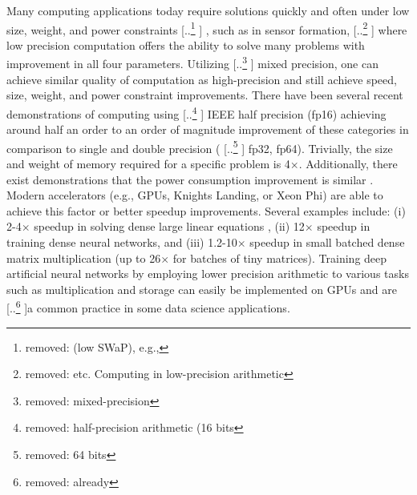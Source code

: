 \documentclass[review,onefignum,onetabnum]{siamart190516}
\providecommand{\DIFadd}[1]{{\protect\color{blue} \sf #1}} %
\providecommand{\DIFdel}[1]{{\protect\color{red} [..\footnote{removed: #1} ]}} %
\providecommand{\DIFaddbegin}{} %
\providecommand{\DIFaddend}{} %
\providecommand{\DIFdelbegin}{} %
\providecommand{\DIFdelend}{} %
\begin{document}
Many computing applications today require solutions quickly and often under low size, weight, and power constraints\DIFdelbegin \DIFdel{(low SWaP), e.g., }\DIFdelend \DIFaddbegin \DIFadd{, such as in }\DIFaddend sensor formation, \DIFdelbegin \DIFdel{etc. 
Computing in low-precision arithmetic }\DIFdelend \DIFaddbegin \DIFadd{where
low precision computation }\DIFaddend offers the ability to solve many problems with improvement in all four parameters.
Utilizing \DIFdelbegin \DIFdel{mixed-precision}\DIFdelend \DIFaddbegin \DIFadd{mixed precision}\DIFaddend , one can achieve similar quality of computation as high-precision and still achieve 
speed, size, weight, and power constraint improvements. 
There have been several recent demonstrations of computing using \DIFdelbegin \DIFdel{half-precision arithmetic (16 bits}\DIFdelend \DIFaddbegin \DIFadd{IEEE half precision (fp16}\DIFaddend ) achieving around half an order to an order of magnitude improvement of these categories in comparison to \DIFaddbegin \DIFadd{single and }\DIFaddend double precision (\DIFdelbegin \DIFdel{64 bits}\DIFdelend \DIFaddbegin \DIFadd{fp32, fp64}\DIFaddend ).
Trivially, the size and weight of memory required for a specific problem is 4$\times$.
Additionally, there exist demonstrations that the power consumption improvement is similar
\cite{fagan2016powerwall}.
Modern accelerators (e.g., GPUs, Knights Landing, or Xeon Phi) are able to achieve this factor or better speedup improvements.
Several examples include:
(i)   2-4$\times$ speedup in solving dense large linear equations \cite{haidar2018iterative,haidar2019tensorcore},
(ii)  12$\times$ speedup in training dense neural networks,
and
(iii) 1.2-10$\times$ speedup in small batched dense matrix multiplication \cite{abdelfattah2019batched} (up to 26$\times$ for batches of tiny matrices).
Training deep artificial neural networks by employing lower precision arithmetic to various tasks such as multiplication \cite{Courbariaux2014Mult} and storage \cite{Courbariaux2014Storage} can easily be implemented on GPUs and are \DIFdelbegin \DIFdel{already }\DIFdelend a common practice in \DIFaddbegin \DIFadd{some }\DIFaddend data science applications.\par
\end{document}
